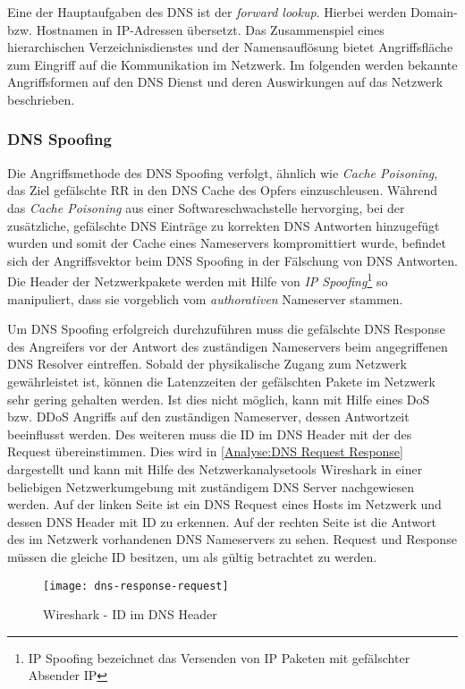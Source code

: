 Eine der Hauptaufgaben des \ac{DNS} ist der \textit{forward lookup}. Hierbei werden Domain- bzw. Hostnamen in \ac{IP}-Adressen übersetzt. Das Zusammenspiel eines hierarchischen Verzeichnisdienstes und der Namensauflösung bietet Angriffsfläche zum Eingriff auf die Kommunikation im Netzwerk. Im folgenden werden bekannte Angriffsformen auf den \ac{DNS} Dienst und deren Auswirkungen auf das Netzwerk beschrieben.

\subsubsection{\ac{DNS} Spoofing}
Die Angriffsmethode des \ac{DNS} Spoofing verfolgt, ähnlich wie \textit{Cache Poisoning}, das Ziel gefälschte \ac{RR} in den \ac{DNS} Cache des Opfers einzuschleusen. Während das \textit{Cache Poisoning} aus einer Softwareschwachstelle hervorging, bei der zusätzliche, gefälschte \ac{DNS} Einträge zu korrekten \ac{DNS} Antworten hinzugefügt wurden und somit der Cache eines Nameservers kompromittiert wurde, befindet sich der Angriffsvektor beim \ac{DNS} Spoofing in der Fälschung von \ac{DNS} Antworten. Die Header der Netzwerkpakete werden mit Hilfe von \textit{IP Spoofing}\footnote{IP Spoofing bezeichnet das Versenden von IP Paketen mit gefälschter Absender IP} so manipuliert, dass sie vorgeblich vom \textit{authorativen} Nameserver stammen. 

Um \ac{DNS} Spoofing erfolgreich durchzuführen muss die gefälschte \ac{DNS} Response des Angreifers vor der Antwort des zuständigen Nameservers beim angegriffenen \ac{DNS} Resolver eintreffen. Sobald der physikalische Zugang zum Netzwerk gewährleistet ist, können die Latenzzeiten der gefälschten Pakete im Netzwerk sehr gering gehalten werden. Ist dies nicht möglich, kann mit Hilfe eines \ac{DoS} bzw. \ac{DDoS} Angriffs auf den zuständigen Nameserver, dessen Antwortzeit beeinflusst werden. Des weiteren muss die ID im \ac{DNS} Header mit der des Request übereinstimmen. Dies wird in \autoref{Analyse:DNS Request Response} dargestellt und kann mit Hilfe des Netzwerkanalysetools Wireshark in einer beliebigen Netzwerkumgebung mit zuständigem \ac{DNS} Server nachgewiesen werden. Auf der linken Seite ist ein DNS Request eines Hosts im Netzwerk und dessen \ac{DNS} Header mit ID zu erkennen. Auf der rechten Seite ist die Antwort des im Netzwerk vorhandenen \ac{DNS} Nameservers zu sehen. Request und Response müssen die gleiche ID besitzen, um als gültig betrachtet zu werden.

\begin{figure}[h]
    \centering
    \texttt{[image: dns-response-request]}
    \caption{Wireshark - ID im DNS Header}
    \label{Analyse:DNS Request Response}
\end{figure}


